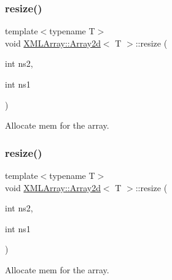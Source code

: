 \subsubsection{\texorpdfstring{resize()}{resize()}\hspace{0.1cm}{\footnotesize\ttfamily [1/3]}}
{\footnotesize\ttfamily template$<$typename T$>$ \\
void \mbox{\hyperlink{classXMLArray_1_1Array2d}{X\+M\+L\+Array\+::\+Array2d}}$<$ T $>$\+::resize (\begin{DoxyParamCaption}\item[{int}]{ns2,  }\item[{int}]{ns1 }\end{DoxyParamCaption})\hspace{0.3cm}{\ttfamily [inline]}}



Allocate mem for the array. 

\mbox{\label{classXMLArray_1_1Array2d_a64001cb2aac062d2179a0285b0279244}} 
\subsubsection{\texorpdfstring{resize()}{resize()}\hspace{0.1cm}{\footnotesize\ttfamily [2/3]}}
{\footnotesize\ttfamily template$<$typename T$>$ \\
void \mbox{\hyperlink{classXMLArray_1_1Array2d}{X\+M\+L\+Array\+::\+Array2d}}$<$ T $>$\+::resize (\begin{DoxyParamCaption}\item[{int}]{ns2,  }\item[{int}]{ns1 }\end{DoxyParamCaption})\hspace{0.3cm}{\ttfamily [inline]}}



Allocate mem for the array. 

